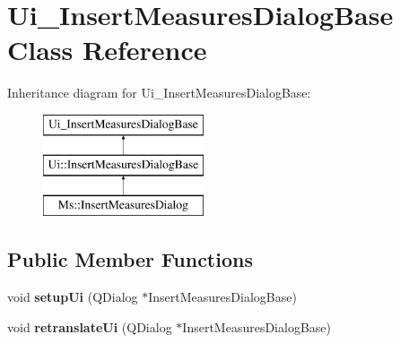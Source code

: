 \hypertarget{class_ui___insert_measures_dialog_base}{}\section{Ui\+\_\+\+Insert\+Measures\+Dialog\+Base Class Reference}
\label{class_ui___insert_measures_dialog_base}
Inheritance diagram for Ui\+\_\+\+Insert\+Measures\+Dialog\+Base\+:\begin{figure}[H]
\begin{center}
\leavevmode
\includegraphics[height=3.000000cm]{class_ui___insert_measures_dialog_base}
\end{center}
\end{figure}
\subsection*{Public Member Functions}
\begin{DoxyCompactItemize}
\item 
\mbox{\label{class_ui___insert_measures_dialog_base_aaf34c4866e9f68465b46c338de41f8f1}} 
void {\bfseries setup\+Ui} (Q\+Dialog $\ast$Insert\+Measures\+Dialog\+Base)
\item 
\mbox{\label{class_ui___insert_measures_dialog_base_a038ce69c8d4884e1fd425bcd73166418}} 
void {\bfseries retranslate\+Ui} (Q\+Dialog $\ast$Insert\+Measures\+Dialog\+Base)
\end{DoxyCompactItemize}
